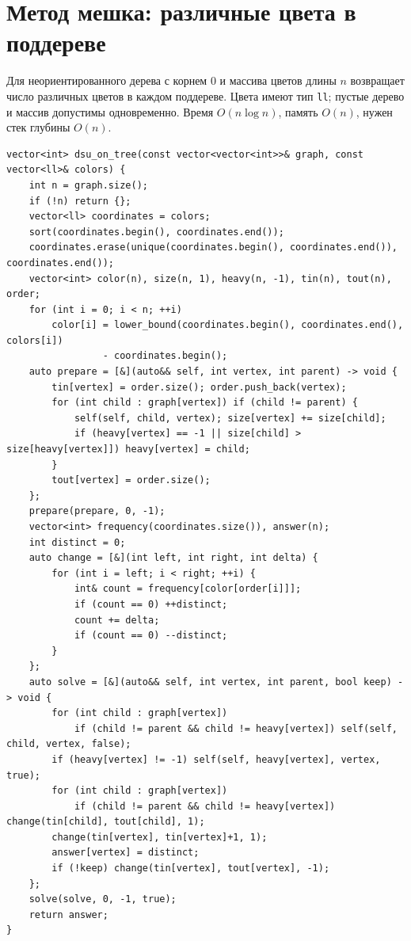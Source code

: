 \section{Метод мешка: различные цвета в поддереве}
Для неориентированного дерева с корнем 0 и массива цветов длины $n$ возвращает число различных цветов в каждом поддереве.
Цвета имеют тип \texttt{ll}; пустые дерево и массив допустимы одновременно.
Время $O(n\log n)$, память $O(n)$, нужен стек глубины $O(n)$.
\begin{lstlisting}[name=dsu_on_tree]
vector<int> dsu_on_tree(const vector<vector<int>>& graph, const vector<ll>& colors) {
    int n = graph.size();
    if (!n) return {};
    vector<ll> coordinates = colors;
    sort(coordinates.begin(), coordinates.end());
    coordinates.erase(unique(coordinates.begin(), coordinates.end()), coordinates.end());
    vector<int> color(n), size(n, 1), heavy(n, -1), tin(n), tout(n), order;
    for (int i = 0; i < n; ++i)
        color[i] = lower_bound(coordinates.begin(), coordinates.end(), colors[i])
                 - coordinates.begin();
    auto prepare = [&](auto&& self, int vertex, int parent) -> void {
        tin[vertex] = order.size(); order.push_back(vertex);
        for (int child : graph[vertex]) if (child != parent) {
            self(self, child, vertex); size[vertex] += size[child];
            if (heavy[vertex] == -1 || size[child] > size[heavy[vertex]]) heavy[vertex] = child;
        }
        tout[vertex] = order.size();
    };
    prepare(prepare, 0, -1);
    vector<int> frequency(coordinates.size()), answer(n);
    int distinct = 0;
    auto change = [&](int left, int right, int delta) {
        for (int i = left; i < right; ++i) {
            int& count = frequency[color[order[i]]];
            if (count == 0) ++distinct;
            count += delta;
            if (count == 0) --distinct;
        }
    };
    auto solve = [&](auto&& self, int vertex, int parent, bool keep) -> void {
        for (int child : graph[vertex])
            if (child != parent && child != heavy[vertex]) self(self, child, vertex, false);
        if (heavy[vertex] != -1) self(self, heavy[vertex], vertex, true);
        for (int child : graph[vertex])
            if (child != parent && child != heavy[vertex]) change(tin[child], tout[child], 1);
        change(tin[vertex], tin[vertex]+1, 1);
        answer[vertex] = distinct;
        if (!keep) change(tin[vertex], tout[vertex], -1);
    };
    solve(solve, 0, -1, true);
    return answer;
}
\end{lstlisting}
%

